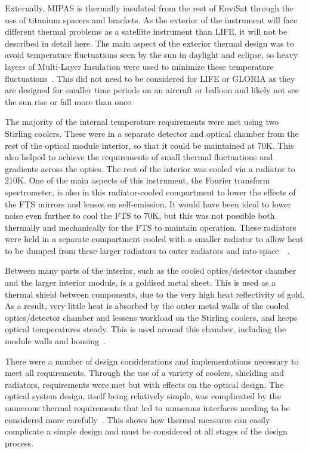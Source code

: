 Externally, MIPAS is thermally insulated from the rest of EnviSat through the use of titanium spacers and brackets. As the exterior of the instrument will face different thermal problems as a satellite instrument than LIFE, it will not be described in detail here. The main aspect of the exterior thermal design was to avoid temperature fluctuations seen by the sun in daylight and eclipse, so heavy layers of Multi-Layer Insulation were used to minimize these temperature fluctuations~\citep{MIPAS_thermal}. This did not need to be considered for LIFE or GLORIA as they are designed for smaller time periods on an aircraft or balloon and likely not see the sun rise or fall more than once. 

The majority of the internal temperature requirements were met using two Stirling coolers. These were in a separate detector and optical chamber from the rest of the optical module interior, so that it could be maintained at 70K. This also helped to achieve the requirements of small thermal fluctuations and gradients across the optics. The rest of the interior was cooled via a radiator to 210K. One of the main aspects of this instrument, the Fourier transform spectrometer, is also in this radiator-cooled compartment to lower the effects of the FTS mirrors and lenses on self-emission. It would have been ideal to lower noise even further to cool the FTS to 70K, but this was not possible both thermally and mechanically for the FTS to maintain operation. These radiators were held in a separate compartment cooled with a smaller radiator to allow heat to be dumped from these larger radiators to outer radiators and into space~\citep{MIPAS_instrument}~\citep{MIPAS_thermal}.

Between many parts of the interior, such as the cooled optics/detector chamber and the larger interior module, is a goldised metal sheet. This is used as a thermal shield between components, due to the very high heat reflectivity of gold. As a result, very little heat is absorbed by the outer metal walls of the cooled optics/detector chamber and lessens workload on the Stirling coolers, and keeps optical temperatures steady. This is used around this chamber, including the module walls and housing~\citep{MIPAS_thermal}.

There were a number of design considerations and implementations necessary to meet all requirements. Through the use of a variety of coolers, shielding and radiators, requirements were met but with effects on the optical design. The optical system design, itself being relatively simple, was complicated by the numerous thermal requirements that led to numerous interfaces needing to be considered more carefully~\citep{MIPAS_instrument}. This shows how thermal measures can easily complicate a simple design and must be considered at all stages of the design process.

